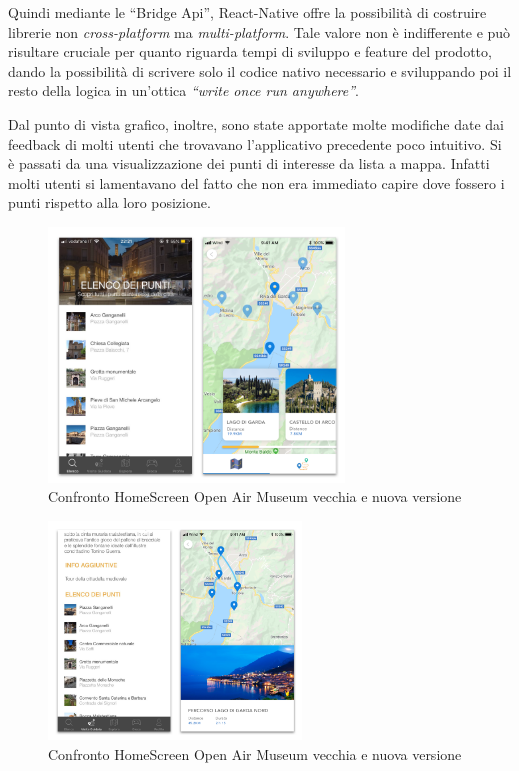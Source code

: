 Quindi mediante le “Bridge Api”, React-Native offre la possibilità di costruire librerie non \emph{cross-platform} ma \emph{multi-platform}. Tale valore non è indifferente e può risultare cruciale per quanto riguarda tempi di sviluppo e feature del prodotto, dando la possibilità di scrivere solo il codice nativo necessario e sviluppando poi il resto della logica in un'ottica \emph{“write once run anywhere”}.\vspace{5mm}

Dal punto di vista grafico, inoltre, sono state apportate molte modifiche date dai feedback di molti utenti che trovavano l’applicativo precedente poco intuitivo. Si è passati da una visualizzazione dei punti di interesse da lista a mappa. Infatti molti utenti si lamentavano del fatto che non era immediato capire dove fossero i punti rispetto alla loro posizione.\vspace{5mm}

\begin{figure}[h]
\centering
\includegraphics[width=0.7\textwidth]{images/punti.png}
\caption{Confronto HomeScreen Open Air Museum vecchia e nuova versione}
\end{figure}

\begin{figure}[h]
\centering
\includegraphics[width=0.6\textwidth]{images/percorsi.png}
\caption{Confronto HomeScreen Open Air Museum vecchia e nuova versione}
\end{figure}\vspace{19mm}

